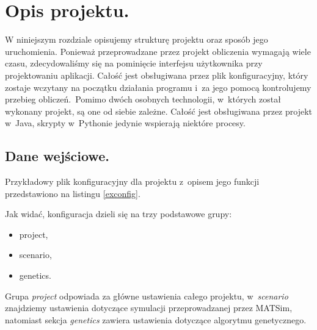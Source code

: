 \documentclass[twoside,12pt]{report}
\let\oldsection\chapter
\def\chapter{\cleardoublepage\oldsection}
\begin{document}
\chapter{Opis projektu.}\label{rozdz.opis} 

W niniejszym rozdziale opisujemy strukturę projektu oraz sposób jego uruchomienia. Ponieważ przeprowadzane przez projekt obliczenia wymagają wiele czasu, zdecydowaliśmy się na pominięcie interfejsu użytkownika przy projektowaniu aplikacji. Całość jest obsługiwana przez plik konfiguracyjny, który zostaje wczytany na początku działania programu i~za jego pomocą kontrolujemy przebieg obliczeń.~Pomimo dwóch osobnych technologii, w~których został wykonany projekt, są one od siebie zależne. Całość jest obsługiwana przez projekt w~Java, skrypty w~Pythonie jedynie wspierają niektóre procesy.

\section{Dane wejściowe.}

Przykładowy plik konfiguracyjny dla projektu z~opisem jego funkcji przedstawiono na listingu \ref{exconfig}.

 

\vspace*{15px}

Jak widać, konfiguracja dzieli się na trzy podstawowe grupy:
\begin{itemize}
\item project,
\item scenario,
\item genetics.
\end{itemize}

\vspace*{15px}

Grupa \textit{project} odpowiada za główne ustawienia całego projektu, w~\textit{scenario} znajdziemy ustawienia dotyczące symulacji przeprowadzanej przez MATSim, natomiast sekcja \textit{genetics} zawiera ustawienia dotyczące algorytmu genetycznego.

\vspace*{15px}
\end{document}
